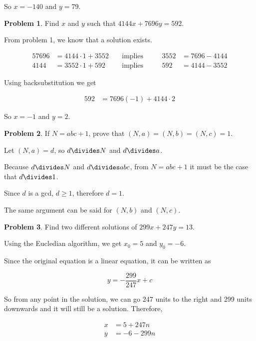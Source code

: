 \documentclass{article}
\theoremstyle{definition}
\newtheorem{problem}{Problem}
\begin{document}
  So $x = -140$ and $y = 79$.
  
  \begin{problem}
    Find $x$ and $y$ such that $4144x + 7696y = 592$.
  \end{problem}
  
  From problem 1, we know that a solution exists.
  
  \begin{alignat*}{5}
    7696 &= 4144 \cdot 1 + 3552 &\;&\text{implies} &\;&&3552 &= 7696 - 4144 \\
    4144 &= 3552 \cdot 1 + 592 &\;&\text{implies} &\;&&592 &= 4144 - 3552
  \end{alignat*}
  
  Using backsubstitution we get
  
  \begin{align*}
    592 &= 7696 (-1) + 4144 \cdot 2
  \end{align*}
  
  So $x = -1$ and $y = 2$.
  
  \begin{problem}
    If $N = abc + 1$, prove that $(N, a) = (N, b) = (N, c) = 1$.
  \end{problem}
  
  Let $(N, a) = d$, so $d \divides N$ and $d \divides a$.
  
  Because $d \divides N$ and $d \divides abc$, from $N = abc + 1$ it must be the case that $d \divides 1$.
  
  Since $d$ is a gcd, $d \geq 1$, therefore $d = 1$.
  
  The same argument can be said for $(N, b)$ and $(N, c)$.
  
  \begin{problem}
    Find two different solutions of $299x + 247y = 13$.
  \end{problem}
  
  Using the Eucledian algorithm, we get $x_0 = 5$ and $y_0 = -6$.
  
  Since the original equation is a linear equation, it can be written as
  
  \begin{equation}
    y = -\frac{299}{247} x + c
  \end{equation}
  
  So from any point in the solution, we can go 247 units to the right
  and 299 units downwards and it will still be a solution. Therefore,
  
  \begin{align*}
    x &= 5 + 247n \\
    y &= -6 -299n
  \end{align*}
  
\end{document}

